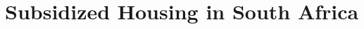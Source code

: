 \documentclass[12pt]{article}
\begin{document}
 
















\section{Subsidized Housing in South Africa} \label{section:background}
\end{document}
